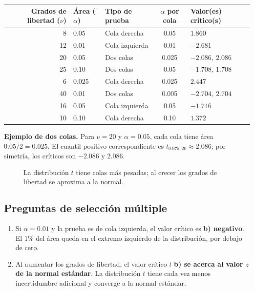 \documentclass[11pt]{article}
\begin{document}
\begin{center}
\small
\begin{tabular}{r l l c l}
\toprule
Grados de libertad ($\nu$) & Área ($\alpha$) & Tipo de prueba & $\alpha$ por cola & Valor(es) crítico(s) \\
\midrule
8  & 0.05  & Cola derecha & 0.05 & $1.860$ \\
12 & 0.01  & Cola izquierda & 0.01 & $-2.681$ \\
20 & 0.05  & Dos colas & 0.025 & $-2.086,\ 2.086$ \\
25 & 0.10  & Dos colas & 0.05 & $-1.708,\ 1.708$ \\
6  & 0.025 & Cola derecha & 0.025 & $2.447$ \\
40 & 0.01  & Dos colas & 0.005 & $-2.704,\ 2.704$ \\
16 & 0.05  & Cola izquierda & 0.05 & $-1.746$ \\
10 & 0.10  & Cola derecha & 0.10 & $1.372$ \\
\bottomrule
\end{tabular}
\end{center}

\textbf{Ejemplo de dos colas.} Para $\nu=20$ y $\alpha=0.05$, cada cola tiene área $0.05/2=0.025$. El cuantil positivo correspondiente es $t_{0.975,20}\approx2.086$; por simetría, los críticos son $-2.086$ y $2.086$.

\begin{figure}[htbp]
\centering
{}
\caption{La distribución $t$ tiene colas más pesadas; al crecer los grados de libertad se aproxima a la normal.}
\label{fig:t-normal}
\end{figure}

\subsection{Preguntas de selección múltiple}
\begin{enumerate}
  \item Si $\alpha=0.01$ y la prueba es de cola izquierda, el valor crítico es \textbf{b) negativo}. El 1\% del área queda en el extremo izquierdo de la distribución, por debajo de cero.
  \item Al aumentar los grados de libertad, el valor crítico $t$ \textbf{b) se acerca al valor $z$ de la normal estándar}. La distribución $t$ tiene cada vez menos incertidumbre adicional y converge a la normal estándar.
\end{enumerate}
\end{document}
